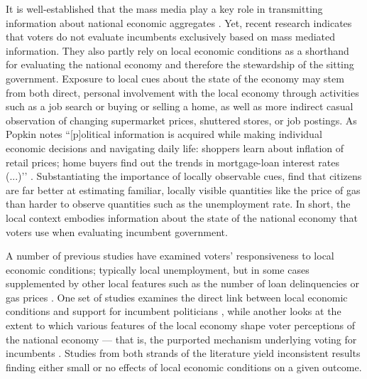 \documentclass[12pt,a4paper]{article}
\begin{document}
	It is well-established that the mass media play a key role in transmitting information about national economic aggregates \citep[e.g.,][]{soroka2015s}. Yet, recent research indicates that voters do not evaluate incumbents exclusively based on mass mediated information. They also partly rely on local economic conditions as a shorthand for evaluating the national economy \citep{bisgaard2016reconsidering, reeves2012ecologies} and therefore the stewardship of the sitting government. Exposure to local cues about the state of the economy may stem from both direct, personal involvement with the local economy through activities such as a job search or buying or selling a home, as well as more indirect casual observation of changing supermarket prices, shuttered stores, or job postings. As Popkin \citeyearpar[][p. 24]{popkin1994reasoning} notes ``[p]olitical information is acquired while making individual economic decisions and navigating daily life: shoppers learn about inflation of retail prices; home buyers find out the trends in mortgage-loan interest rates (...)’’ \cite[see also][p. 5]{fiorina1981retrospective}. Substantiating the importance of locally observable cues, \citep{ansolabehere2012asking} find that citizens are far better at estimating familiar, locally visible quantities like the price of gas than harder to observe quantities such as the unemployment rate. In short, the local context embodies information about the state of the national economy that voters use when evaluating incumbent government. 
	
	A number of previous studies have examined voters’ responsiveness to local economic conditions; typically local unemployment, but in some cases supplemented by other local features such as the number of loan delinquencies \citep{healy2017presidential} or gas prices \citep{reeves2012ecologies}. One set of studies examines the direct link between local economic conditions and support for incumbent politicians \citep{hansford2015reevaluating,eisenberg2004economic,kim2003spatial,healy2017presidential, auberger2005influence,wright2012unemployment, hill2010economic, elinder2010local, johnston2001s,veiga2010impact, kim2003spatial}, while another looks at the extent to which various features of the local economy shape voter perceptions of the national economy — that is, the purported mechanism underlying voting for incumbents  \citep{books1999contextual, reeves2012ecologies,anderson2011local,ansolabehere2014mecro,bisgaard2016reconsidering}. Studies from both strands of the literature yield inconsistent results finding either small or no effects of local economic conditions on a given outcome.   
	
\end{document}
